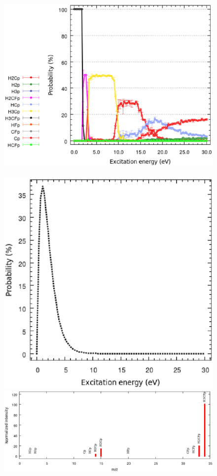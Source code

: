 \documentclass[a4paper,12pt]{article}
\begin{document}
\begin{figure}[hb!]
\centering
\includegraphics[scale=0.45]{images/CH3F+-S.vs.E.eps}\\
\qquad\qquad\,
\includegraphics[scale=0.45]{images/CH3F+-sfE.eps}\\
\includegraphics[scale=0.45]{images/CH3F-theoSpectrum.eps}

\end{figure}
\end{document}
